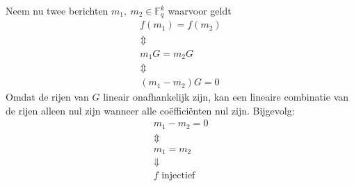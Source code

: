 Neem nu twee berichten $m_1,\ m_2 \in \mathbb{F}_q^k$ waarvoor geldt
\begin{equation*}
    \begin{gathered}
        f(m_1) = f(m_2) \\
        \Updownarrow \\
        m_1G = m_2G \\
        \Updownarrow \\
        (m_1 - m_2)G = 0
    \end{gathered}
\end{equation*}
Omdat de rijen van $G$ lineair onafhankelijk zijn, kan een lineaire combinatie van de rijen alleen nul zijn wanneer alle coëfficiënten nul zijn. Bijgevolg:
\begin{equation*}
    \begin{gathered}
        m_1 - m_2 = 0 \\
        \Updownarrow \\
        m_1 = m_2 \\
        \Downarrow \\
        f \text{ injectief}
    \end{gathered}
\end{equation*}

